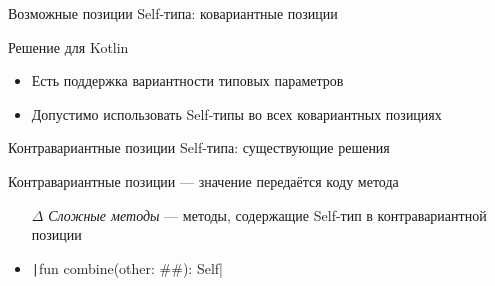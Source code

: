 \documentclass[usenames, dvipsnames]{beamer}
\begin{document}
\begin{frame}[fragile]{Возможные позиции Self-типа: ковариантные позиции}
        \begin{block}{Решение для Kotlin}
            \begin{itemize}
                \item Есть поддержка вариантности типовых параметров
                \item Допустимо использовать Self-типы во всех ковариантных позициях
            \end{itemize}
        \end{block}
    \end{frame}

    \begin{frame}[fragile]{Контравариантные позиции Self-типа: существующие решения}

        \begin{block}{Контравариантные позиции --- значение передаётся коду метода}
            \begin{itemize}
                \item[$\Delta$] \emph{Сложные методы} --- методы, содержащие Self-тип в контравариантной позиции
                \item \texttt|fun combine(other: ##): Self| %
            \end{itemize}
        \end{block}


\end{frame}
\end{document}

